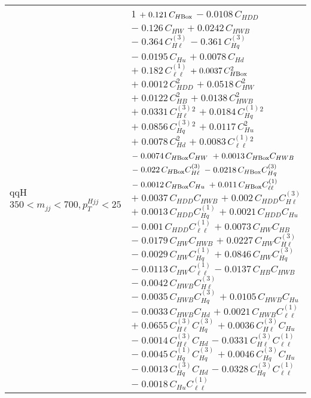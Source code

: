 \begin{tabular}{l|p{}}
    qqH $350 < m_{jj} < 700, p_{T}^{Hjj} < 25$ & 1 $+\;0.121\,C_{H\rm{Box}}$ $-\;0.0108\,C_{HDD}$ $-\;0.126\,C_{HW}$ $+\;0.0242\,C_{HWB}$ $-\;0.364\,C^{(3)}_{H\ell}$ $-\;0.361\,C^{(3)}_{Hq}$ $-\;0.0195\,C_{Hu}$ $+\;0.0078\,C_{Hd}$ $+\;0.182\,C^{(1)}_{\ell\ell}$ $+\;0.0037\,C_{H\rm{Box}}^{2}$ $+\;0.0012\,C_{HDD}^{2}$ $+\;0.0518\,C_{HW}^{2}$ $+\;0.0122\,C_{HB}^{2}$ $+\;0.0138\,C_{HWB}^{2}$ $+\;0.0331\,C^{(3)}_{H\ell}^{2}$ $+\;0.0184\,C^{(1)}_{Hq}^{2}$ $+\;0.0856\,C^{(3)}_{Hq}^{2}$ $+\;0.0117\,C_{Hu}^{2}$ $+\;0.0078\,C_{Hd}^{2}$ $+\;0.0083\,C^{(1)}_{\ell\ell}^{2}$ $-\;0.0074\,C_{H\rm{Box}}C_{HW}$ $+\;0.0013\,C_{H\rm{Box}}C_{HWB}$ $-\;0.022\,C_{H\rm{Box}}C^{(3)}_{H\ell}$ $-\;0.0218\,C_{H\rm{Box}}C^{(3)}_{Hq}$ $-\;0.0012\,C_{H\rm{Box}}C_{Hu}$ $+\;0.011\,C_{H\rm{Box}}C^{(1)}_{\ell\ell}$ $+\;0.0037\,C_{HDD}C_{HWB}$ $+\;0.002\,C_{HDD}C^{(3)}_{H\ell}$ $+\;0.0013\,C_{HDD}C^{(1)}_{Hq}$ $+\;0.0021\,C_{HDD}C_{Hu}$ $-\;0.001\,C_{HDD}C^{(1)}_{\ell\ell}$ $+\;0.0073\,C_{HW}C_{HB}$ $-\;0.0179\,C_{HW}C_{HWB}$ $+\;0.0227\,C_{HW}C^{(3)}_{H\ell}$ $-\;0.0029\,C_{HW}C^{(1)}_{Hq}$ $+\;0.0846\,C_{HW}C^{(3)}_{Hq}$ $-\;0.0113\,C_{HW}C^{(1)}_{\ell\ell}$ $-\;0.0137\,C_{HB}C_{HWB}$ $-\;0.0042\,C_{HWB}C^{(3)}_{H\ell}$ $-\;0.0035\,C_{HWB}C^{(3)}_{Hq}$ $+\;0.0105\,C_{HWB}C_{Hu}$ $-\;0.0033\,C_{HWB}C_{Hd}$ $+\;0.0021\,C_{HWB}C^{(1)}_{\ell\ell}$ $+\;0.0655\,C^{(3)}_{H\ell}C^{(3)}_{Hq}$ $+\;0.0036\,C^{(3)}_{H\ell}C_{Hu}$ $-\;0.0014\,C^{(3)}_{H\ell}C_{Hd}$ $-\;0.0331\,C^{(3)}_{H\ell}C^{(1)}_{\ell\ell}$ $-\;0.0045\,C^{(1)}_{Hq}C^{(3)}_{Hq}$ $+\;0.0046\,C^{(3)}_{Hq}C_{Hu}$ $-\;0.0013\,C^{(3)}_{Hq}C_{Hd}$ $-\;0.0328\,C^{(3)}_{Hq}C^{(1)}_{\ell\ell}$ $-\;0.0018\,C_{Hu}C^{(1)}_{\ell\ell}$ \\

\end{tabular}
